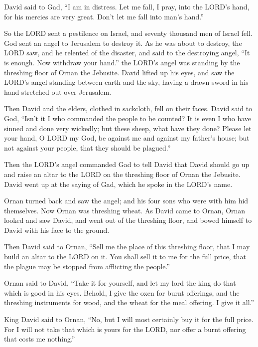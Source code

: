 \myverse{}David said to Gad, “I am in distress. Let me fall, I pray, into
the LORD’s hand, for his mercies are very great. Don’t let me fall into man’s hand.”

\myverse{}So the LORD sent a pestilence on Israel, and seventy thousand
men of Israel fell.
\myverse{}God sent an angel to Jerusalem to destroy it. As he was about to destroy,
the LORD saw, and he relented of the disaster, and said to the destroying angel, “It is enough. Now withdraw
your hand.” the LORD’s angel was standing by the threshing floor of Ornan the Jebusite.
\myverse{}David lifted up his eyes, and saw the LORD’s angel standing between earth
and the sky, having a drawn sword in his hand stretched out over Jerusalem.

Then David and the elders, clothed in sackcloth, fell on their faces.
\myverse{}David said to God, “Isn’t it I who commanded the people to be counted? It
is even I who have sinned and done very wickedly; but these sheep, what have they done? Please let your
hand, O LORD my God, be against me and against my father’s house; but not against your people, that they
should be plagued.”

\myverse{}Then the LORD’s angel commanded Gad to tell David that David
should go up and raise an altar to the LORD on the threshing floor of Ornan the Jebusite.
\myverse{}David went up at the saying of Gad, which he spoke in the LORD’s name.

\myverse{}Ornan turned back and saw the angel; and his four sons who were
with him hid themselves. Now Ornan was threshing wheat.
\myverse{}As David came to Ornan, Ornan looked and saw David, and went out of the threshing
floor, and bowed himself to David with his face to the ground.

\myverse{}Then David said to Ornan, “Sell me the place of this threshing
floor, that I may build an altar to the LORD on it. You shall sell it to me for the full price, that the
plague may be stopped from afflicting the people.”

\myverse{}Ornan said to David, “Take it for yourself, and let my lord
the king do that which is good in his eyes. Behold, I give the oxen for burnt offerings, and the threshing
instruments for wood, and the wheat for the meal offering. I give it all.”

\myverse{}King David said to Ornan, “No, but I will most certainly buy
it for the full price. For I will not take that which is yours for the LORD, nor offer a burnt offering
that costs me nothing.”

